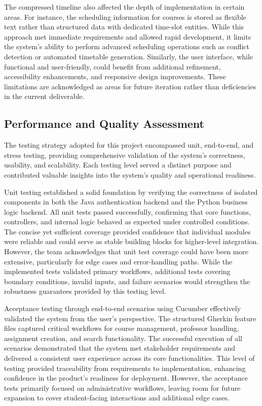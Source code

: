 \documentclass[12pt,a4paper]{article}
\begin{document}
The compressed timeline also affected the depth of implementation in certain areas. For instance, the scheduling information for courses is stored as flexible text rather than structured data with dedicated time-slot entities. While this approach met immediate requirements and allowed rapid development, it limits the system's ability to perform advanced scheduling operations such as conflict detection or automated timetable generation. Similarly, the user interface, while functional and user-friendly, could benefit from additional refinement, accessibility enhancements, and responsive design improvements. These limitations are acknowledged as areas for future iteration rather than deficiencies in the current deliverable.

\subsection{Performance and Quality Assessment}
The testing strategy adopted for this project encompassed unit, end-to-end, and stress testing, providing comprehensive validation of the system's correctness, usability, and scalability. Each testing level served a distinct purpose and contributed valuable insights into the system's quality and operational readiness.\newline

Unit testing established a solid foundation by verifying the correctness of isolated components in both the Java authentication backend and the Python business logic backend. All unit tests passed successfully, confirming that core functions, controllers, and internal logic behaved as expected under controlled conditions. The concise yet sufficient coverage provided confidence that individual modules were reliable and could serve as stable building blocks for higher-level integration. However, the team acknowledges that unit test coverage could have been more extensive, particularly for edge cases and error-handling paths. While the implemented tests validated primary workflows, additional tests covering boundary conditions, invalid inputs, and failure scenarios would strengthen the robustness guarantees provided by this testing level.

Acceptance testing through end-to-end scenarios using Cucumber effectively validated the system from the user's perspective. The structured Gherkin feature files captured critical workflows for course management, professor handling, assignment creation, and search functionality. The successful execution of all scenarios demonstrated that the system met stakeholder requirements and delivered a consistent user experience across its core functionalities. This level of testing provided traceability from requirements to implementation, enhancing confidence in the product's readiness for deployment. However, the acceptance tests primarily focused on administrative workflows, leaving room for future expansion to cover student-facing interactions and additional edge cases.
\end{document}
